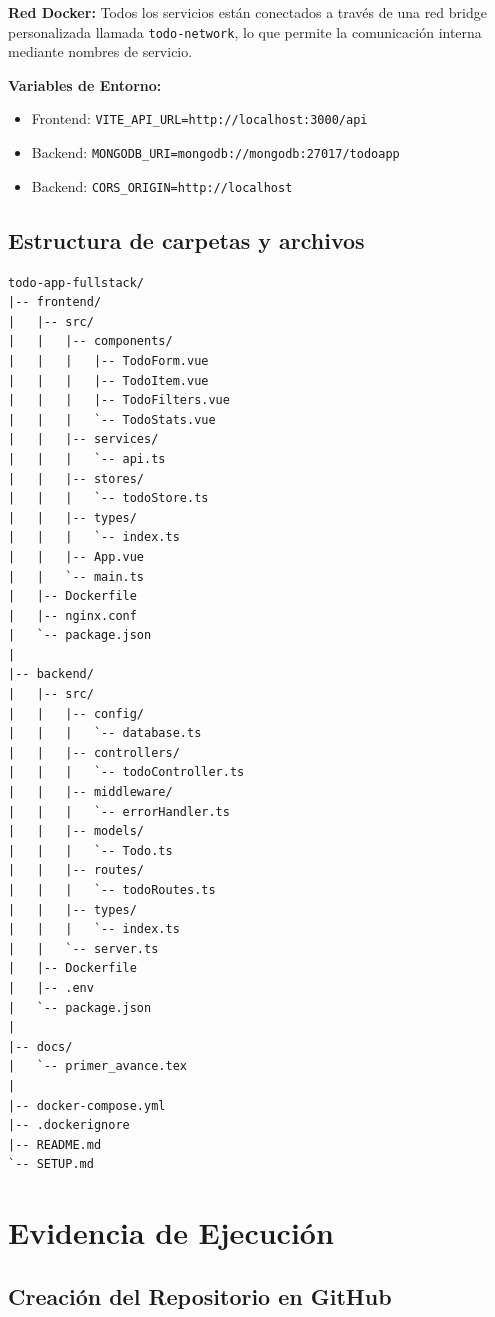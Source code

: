 \documentclass[12pt,a4paper]{article}
\begin{document}
\textbf{Red Docker:} Todos los servicios están conectados a través de una red bridge personalizada llamada \texttt{todo-network}, lo que permite la comunicación interna mediante nombres de servicio.

\textbf{Variables de Entorno:}
\begin{itemize}
    \item Frontend: \texttt{VITE\_API\_URL=http://localhost:3000/api}
    \item Backend: \texttt{MONGODB\_URI=mongodb://mongodb:27017/todoapp}
    \item Backend: \texttt{CORS\_ORIGIN=http://localhost}
\end{itemize}

\subsection{Estructura de carpetas y archivos}

\begin{lstlisting}[caption=Estructura del proyecto]
todo-app-fullstack/
|-- frontend/
|   |-- src/
|   |   |-- components/
|   |   |   |-- TodoForm.vue
|   |   |   |-- TodoItem.vue
|   |   |   |-- TodoFilters.vue
|   |   |   `-- TodoStats.vue
|   |   |-- services/
|   |   |   `-- api.ts
|   |   |-- stores/
|   |   |   `-- todoStore.ts
|   |   |-- types/
|   |   |   `-- index.ts
|   |   |-- App.vue
|   |   `-- main.ts
|   |-- Dockerfile
|   |-- nginx.conf
|   `-- package.json
|
|-- backend/
|   |-- src/
|   |   |-- config/
|   |   |   `-- database.ts
|   |   |-- controllers/
|   |   |   `-- todoController.ts
|   |   |-- middleware/
|   |   |   `-- errorHandler.ts
|   |   |-- models/
|   |   |   `-- Todo.ts
|   |   |-- routes/
|   |   |   `-- todoRoutes.ts
|   |   |-- types/
|   |   |   `-- index.ts
|   |   `-- server.ts
|   |-- Dockerfile
|   |-- .env
|   `-- package.json
|
|-- docs/
|   `-- primer_avance.tex
|
|-- docker-compose.yml
|-- .dockerignore
|-- README.md
`-- SETUP.md
\end{lstlisting}

\newpage

\section{Evidencia de Ejecución}

\subsection{Creación del Repositorio en GitHub}
\end{document}

